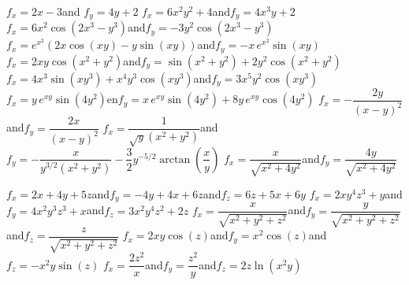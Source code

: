 \begin{Answer}

    \Question $f_x = 2x-3$\qquad and \qquad $f_y = 4y+2$ 
    \Question $f_x = 6x^2y^2+4$\qquad and\qquad $f_y = 4x^3y+2$ 
    \Question $f_x = 6x^2\cos\left(2x^3-y^3\right)$\qquad and\qquad $f_y = -3y^2 \cos\left(2x^3-y^3\right)$ 
    \Question $f_x = e^{x^2}\left(2x\cos(xy)-y\sin(xy)\right)$\qquad and\qquad $f_y = -x\,e^{x^2}\sin(xy)$ 
    \Question  $f_x = 2xy\cos\left(x^2+y^2\right)$\qquad and\qquad $f_y = \sin\left(x^2+y^2\right) + 2y^2 \cos\left(x^2+y^2\right)$ 
    \Question $f_x = 4x^3\sin\left(xy^3\right) + x^4y^3\cos\left(xy^3\right) $\qquad and\qquad $f_y = 3x^5y^2\cos\left(xy^3\right)$  
    \Question $f_x = y\,e^{xy}\sin\left(4y^2\right)$\qquad en\qquad $f_y = x\,e^{xy}\sin\left(4y^2\right) + 8y\,e^{xy}\cos\left(4y^2\right)$ 
    \Question $f_x = -\dfrac{2y}{(x-y)^2}$\qquad and\qquad $f_y = \dfrac{2x}{(x-y)^2}$ 
    \Question $f_x = \dfrac{1}{\sqrt{y}\left(x^2+y^2\right)}$\qquad and\qquad $f_y = -\dfrac{x}{y^{3/2} \left(x^2 + y^2\right)} - \dfrac{3}{2}y^{-5/2} \arctan\left(\dfrac{x}{y}\right)$ 
    \Question $f_x = \dfrac{x}{\sqrt{x^2+4y^2}} $\qquad and\qquad $f_y = \dfrac{4y}{\sqrt{x^2+4y^2}}$ 
    
    \Question  $f_x = 2x+4y+5z$\qquad and\qquad $f_y = -4y+4x+6z$\qquad and\qquad $f_z = 6z+5x+6y$ 
    \Question $f_x = 2xy^4z^3+y$\qquad and\qquad $f_y = 4x^2y^3z^3+x $\qquad and\qquad $f_z = 3x^2y^4z^2+2z$  
    \Question $f_x = \dfrac{x}{\sqrt{x^2+y^2+z^2}}$\qquad and\qquad $f_y = \dfrac{y}{\sqrt{x^2+y^2+z^2}}$\qquad and\qquad $f_z = \dfrac{z}{\sqrt{x^2+y^2+z^2}}$  
    \Question $f_x = 2xy\cos(z)$\qquad and\qquad $f_y = x^2\cos(z) $\qquad and\qquad $f_z = -x^2y\sin(z)$  
    \Question $f_x = \dfrac{2z^2}{x}$\qquad and\qquad $f_y = \dfrac{z^2}{y}$\qquad and\qquad $f_z = 2z\ln(x^2y)$  
    
\end{Answer}
\fi





